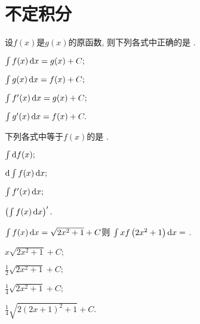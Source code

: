 \chapter{不定积分}



\begin{problem} 设$f(x)$是$g(x)$的原函数, 则下列各式中正确的是 .

\begin{abcd} \item$\int f(x)\mathop{}\!\mathrm{d} x = g(x) + C;$

\item $\int g(x)\mathop{}\!\mathrm{d} x = f(x) + C;$

\item $\int f'(x)\mathop{}\!\mathrm{d} x = g(x) + C;$

\item $\int g'(x)\mathop{}\!\mathrm{d} x = f(x) + C.$

\end{abcd}

\end{problem}           

\begin{problem} 下列各式中等于$f(x)$的是 .

\begin{abcd} \item$\int \d f(x);$

\item $\d\int f(x)\dx;$

\item $\int f'(x)\mathop{}\!\mathrm{d} x;$

\item $\left( \int f(x)\mathop{}\!\mathrm{d} x \right)'.$

\end{abcd}

\end{problem}           

\begin{problem} $\int f(x)\mathop{}\!\mathrm{d} x = \sqrt{2x^{2} + 1} + C$则
$\int xf\left( 2x^{2} + 1 \right)\mathop{}\!\mathrm{d} x =$ .

\begin{abcd} 
\item$\displaystyle x\sqrt{2x^{2} + 1} + C;$

\item $\displaystyle \frac{1}{2}\sqrt{2x^{2} + 1} + C;$

\item $\displaystyle \frac{1}{4}\sqrt{2x^{2} + 1} + C;$

\item $\displaystyle \frac{1}{4}\sqrt{2(2x + 1)^{2} + 1} + C.$

\end{abcd}

\end{problem}           

